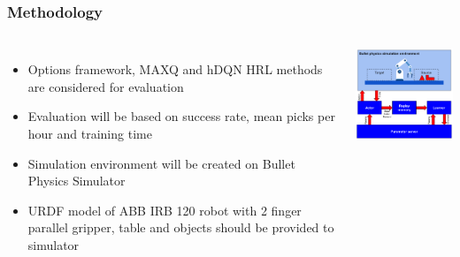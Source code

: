 \documentclass{beamer}
\begin{document}
	\begin{frame}[allowframebreaks]
		\frametitle{Methodology}
		
		\begin{columns}[c]
			\begin{itemize}
				\item Options framework, MAXQ and hDQN HRL methods are considered for evaluation
				\item Evaluation will be based on  success rate, mean picks per hour and training time
				\item Simulation environment will be created on Bullet Physics Simulator
				\item URDF model of ABB IRB 120 robot with 2 finger parallel gripper, table and objects should be provided to simulator
			\end{itemize}
			
			\includegraphics[width=6cm]{setup}
		\end{columns}
	


\end{frame}
\end{document}
